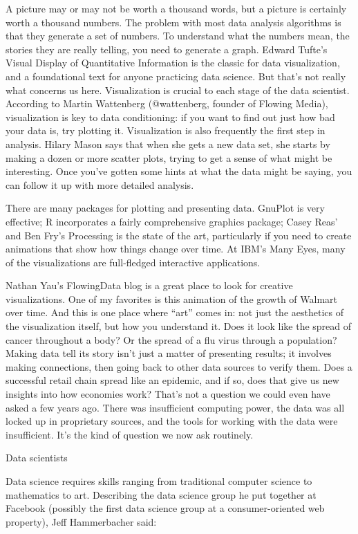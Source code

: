 A picture may or may not be worth a thousand words, but a picture is certainly worth a thousand numbers. The problem with most data analysis algorithms is that they generate a set of numbers. To understand what the numbers mean, the stories they are really telling, you need to generate a graph. Edward Tufte’s Visual Display of Quantitative Information is the classic for data visualization, and a foundational text for anyone practicing data science. But that’s not really what concerns us here. Visualization is crucial to each stage of the data scientist. According to Martin Wattenberg (@wattenberg, founder of Flowing Media), visualization is key to data conditioning: if you want to find out just how bad your data is, try plotting it. Visualization is also frequently the first step in analysis. Hilary Mason says that when she gets a new data set, she starts by making a dozen or more scatter plots, trying to get a sense of what might be interesting. Once you’ve gotten some hints at what the data might be saying, you can follow it up with more detailed analysis.

There are many packages for plotting and presenting data. GnuPlot is very effective; R incorporates a fairly comprehensive graphics package; Casey Reas’ and Ben Fry’s Processing is the state of the art, particularly if you need to create animations that show how things change over time. At IBM’s Many Eyes, many of the visualizations are full-fledged interactive applications.

Nathan Yau’s FlowingData blog is a great place to look for creative visualizations. One of my favorites is this animation of the growth of Walmart over time. And this is one place where “art” comes in: not just the aesthetics of the visualization itself, but how you understand it. Does it look like the spread of cancer throughout a body? Or the spread of a flu virus through a population? Making data tell its story isn’t just a matter of presenting results; it involves making connections, then going back to other data sources to verify them. Does a successful retail chain spread like an epidemic, and if so, does that give us new insights into how economies work? That’s not a question we could even have asked a few years ago. There was insufficient computing power, the data was all locked up in proprietary sources, and the tools for working with the data were insufficient. It’s the kind of question we now ask routinely.

Data scientists

Data science requires skills ranging from traditional computer science to mathematics to art. Describing the data science group he put together at Facebook (possibly the first data science group at a consumer-oriented web property), Jeff Hammerbacher said:

